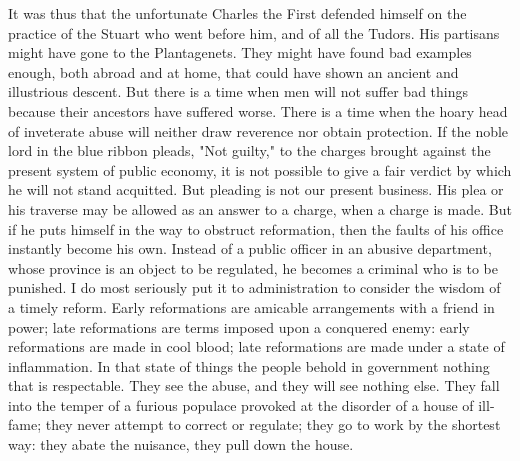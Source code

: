 It was thus that the unfortunate Charles the First defended himself on the practice of the Stuart who went before him, and of all the Tudors. His partisans might have gone to the Plantagenets. They might have found bad examples enough, both abroad and at home, that could have shown an ancient and illustrious descent. But there is a time when men will not suffer bad things because their ancestors have suffered worse. There is a time when the hoary head of inveterate abuse will neither draw reverence nor obtain protection. If the noble lord in the blue ribbon pleads, "Not guilty," to the charges brought against the present system of public economy, it is not possible to give a fair verdict by which he will not stand acquitted. But pleading is not our present business. His plea or his traverse may be allowed as an answer to a charge, when a charge is made. But if he puts himself in the way to obstruct reformation, then the faults of his office instantly become his own. Instead of a public officer in an abusive department, whose province is an object to be regulated, he becomes a criminal who is to be punished. I do most seriously put it to administration to consider the wisdom of a timely reform. Early reformations are amicable arrangements with a friend in power; late reformations are terms imposed upon a conquered enemy: early reformations are made in cool blood; late reformations are made under a state of inflammation. In that state of things the people behold in government nothing that is respectable. They see the abuse, and they will see nothing else. They fall into the temper of a furious populace provoked at the disorder of a house of ill-fame; they never attempt to correct or regulate; they go to work by the shortest way: they abate the nuisance, they pull down the house.

